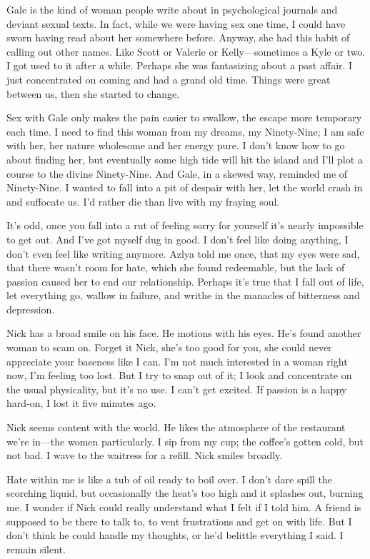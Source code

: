 Gale is the kind of woman people write about in psychological journals
and deviant sexual texts. In fact, while we were having sex one time, I
could have sworn having read about her somewhere before. Anyway, she had
this habit of calling out other names. Like Scott or Valerie or
Kelly---sometimes a Kyle or two. I got used to it after a while. Perhaps
she was fantasizing about a past affair. I just concentrated on coming
and had a grand old time. Things were great between us, then she started
to change.

Sex with Gale only makes the pain easier to swallow, the escape more
temporary each time. I need to find this woman from my dreams, my
Ninety-Nine; I am safe with her, her nature wholesome and her energy
pure. I don't know how to go about finding her, but eventually some high
tide will hit the island and I'll plot a course to the divine
Ninety-Nine. And Gale, in a skewed way, reminded me of Ninety-Nine. I
wanted to fall into a pit of despair with her, let the world crash in
and suffocate us. I'd rather die than live with my fraying soul.

It's odd, once you fall into a rut of feeling sorry for yourself it's
nearly impossible to get out. And I've got myself dug in good. I don't
feel like doing anything, I don't even feel like writing anymore. Azlya
told me once, that my eyes were sad, that there wasn't room for hate,
which she found redeemable, but the lack of passion caused her to end
our relationship. Perhaps it's true that I fall out of life, let
everything go, wallow in failure, and writhe in the manacles of
bitterness and depression.

Nick has a broad smile on his face. He motions with his eyes. He's found
another woman to scam on. Forget it Nick, she's too good for you, she
could never appreciate your baseness like I can. I'm not much interested
in a woman right now, I'm feeling too lost. But I try to snap out of it;
I look and concentrate on the usual physicality, but it's no use. I
can't get excited. If passion is a happy hard-on, I lost it five minutes
ago.

Nick seems content with the world. He likes the atmosphere of the
restaurant we're in---the women particularly. I sip from my cup; the
coffee's gotten cold, but not bad. I wave to the waitress for a refill.
Nick smiles broadly.

Hate within me is like a tub of oil ready to boil over. I don't dare
spill the scorching liquid, but occasionally the heat's too high and it
splashes out, burning me. I wonder if Nick could really understand what
I felt if I told him. A friend is supposed to be there to talk to, to
vent frustrations and get on with life. But I don't think he could
handle my thoughts, or he'd belittle everything I said. I remain silent.

